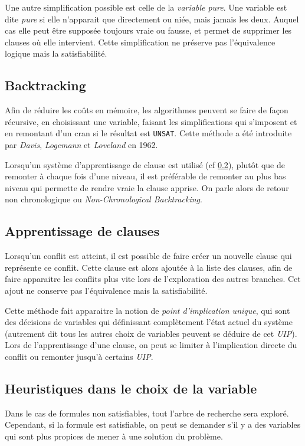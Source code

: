 Une autre simplification possible est celle de la \emph{variable pure}. Une
variable est dite \emph{pure} si elle n'apparait que directement ou niée, mais
jamais les deux. Auquel cas elle peut être supposée toujours vraie ou fausse,
et permet de supprimer les clauses où elle intervient. Cette simplification
ne préserve pas l'équivalence logique mais la satisfiabilité.

\subsection{Backtracking}\label{back}
Afin de réduire les coûts en mémoire, les algorithmes peuvent se faire de
façon récursive, en choisissant une variable, faisant les simplifications qui
s'imposent et en remontant d'un cran si le résultat est \texttt{UNSAT}. Cette
méthode a été introduite par \emph{Davis}, \emph{Logemann} et \emph{Loveland}
en 1962. 

Lorsqu'un système d'apprentissage de clause est utilisé (cf \ref{cdcl}), plutôt
que de remonter à chaque fois d'une niveau, il est préférable de remonter au
plus bas niveau qui permette de rendre vraie la clause apprise. On parle alors
de retour non chronologique ou \emph{Non-Chronological Backtracking}.

\subsection{Apprentissage de clauses}\label{cdcl}
Lorsqu'un conflit est atteint, il est possible de faire créer un nouvelle
clause qui représente ce conflit. Cette clause est alors ajoutée à la liste
des clauses, afin de faire apparaitre les conflits plus vite lors de
l'exploration des autres branches. Cet ajout ne conserve pas l'équivalence
mais la satisfiabilité.

Cette méthode fait apparaitre la notion de \emph{point d'implication unique},
qui sont des décisions de variables qui définissant complètement l'état actuel
du système (autrement dit tous les autres choix de variables peuvent se déduire
de cet \emph{UIP}). Lors de l'apprentissage d'une clause, on peut se limiter
à l'implication directe du conflit ou remonter jusqu'à certains \emph{UIP}.

\subsection{Heuristiques dans le choix de la variable}\label{decision}
Dans le cas de formules non satisfiables, tout l'arbre de recherche sera
exploré. Cependant, si la formule est satisfiable, on peut se demander s'il
y a des variables qui sont plus propices de mener à une solution du problème.

